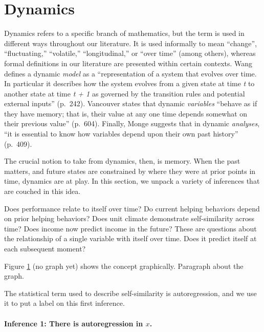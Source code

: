 \documentclass[english,,man]{apa6}
\let\oldparagraph\paragraph
\renewcommand{\paragraph}[1]{\oldparagraph{#1}\mbox{}}
\theoremstyle{definition}
\theoremstyle{definition}
\theoremstyle{definition}
\theoremstyle{remark}
\begin{document}
\hypertarget{dynamics}{%
\section{Dynamics}\label{dynamics}}

Dynamics refers to a specific branch of mathematics, but the term is
used in different ways throughout our literature. It is used informally
to mean \enquote{change}, \enquote{fluctuating,} \enquote{volatile,}
\enquote{longitudinal,} or \enquote{over time} (among others), whereas
formal definitions in our literature are presented within certain
contexts. Wang defines a dynamic \emph{model} as a
\enquote{representation of a system that evolves over time. In
particular it describes how the system evolves from a given state at
time \emph{t} to another state at time \emph{t + 1} as governed by the
transition rules and potential external inputs} (p.~242). Vancouver
states that dynamic \emph{variables} \enquote{behave as if they have
memory; that is, their value at any one time depends somewhat on their
previous value} (p.~604). Finally, Monge suggests that in dynamic
\emph{analyses}, \enquote{it is essential to know how variables depend
upon their own past history} (p.~409).

The crucial notion to take from dynamics, then, is memory. When the past
matters, and future states are constrained by where they were at prior
points in time, dynamics are at play. In this section, we unpack a
variety of inferences that are couched in this idea.

Does performance relate to itself over time? Do current helping
behaviors depend on prior helping behaviors? Does unit climate
demonstrate self-similarity across time? Does income now predict income
in the future? These are questions about the relationship of a single
variable with itself over time. Does it predict itself at each
subsequent moment?

Figure \ref{dynamics} (no graph yet) shows the concept graphically.
Paragraph about the graph.

The statistical term used to describe self-similarity is autoregression,
and we use it to put a label on this first inference.

\hypertarget{inference-1-there-is-autoregression-in-x.}{%
\paragraph{\texorpdfstring{Inference 1: There is autoregression in
\(x\).}{Inference 1: There is autoregression in x.}}\label{inference-1-there-is-autoregression-in-x.}}
\end{document}
